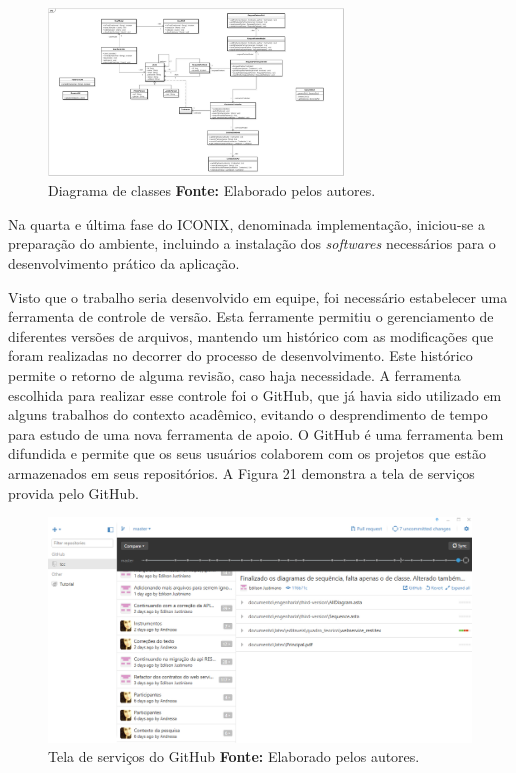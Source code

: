\begin{figure}[h!]
	\centerline{\includegraphics[angle=90,height=0.7\textheight,width=0.7\textwidth]{./imagens/classe.jpg}}
	\caption[Diagrama de classes]
	{Diagrama de classes \textbf{Fonte:} Elaborado pelos autores.}
	\label{fig:exemplo1}
\end{figure}

\newpage
\par Na quarta e última fase do ICONIX, denominada implementação, iniciou-se a preparação do ambiente, incluindo a instalação dos \textit{softwares} necessários para o desenvolvimento prático da aplicação.

\par Visto que o trabalho seria desenvolvido em equipe, foi necessário estabelecer uma ferramenta de controle de versão. Esta ferramente permitiu o gerenciamento de diferentes versões de arquivos, mantendo um histórico com as modificações que foram realizadas no decorrer do processo de desenvolvimento. Este histórico permite o retorno de alguma revisão, caso haja necessidade. A ferramenta escolhida para realizar esse controle foi o GitHub, que já havia sido utilizado em alguns trabalhos do contexto acadêmico, evitando o desprendimento de tempo para estudo de uma nova ferramenta de apoio. O GitHub é uma ferramenta bem difundida e permite que os seus usuários colaborem com os projetos que estão armazenados em seus repositórios\footnotemark[31]. A Figura 21 demonstra a tela de serviços provida pelo GitHub.


\begin{figure}[h!]
	\centerline{\includegraphics[scale=0.35]{./imagens/github.jpg}}
	\caption[Tela de serviços do GitHub ]
	{Tela de serviços do GitHub \textbf{Fonte:} Elaborado pelos autores.}
	\label{fig:exemplo1}
\end{figure}

